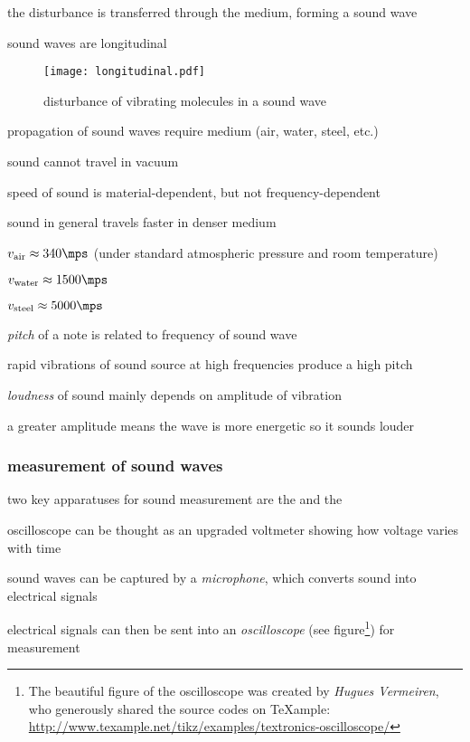 the disturbance is transferred through the medium, forming a sound wave

\cmt sound waves are longitudinal
	
\begin{figure}[htp]
\centering
	\texttt{[image: longitudinal.pdf]}
	\caption*{disturbance of vibrating molecules in a sound wave}
\end{figure}

\cmt propagation of sound waves require medium (air, water, steel, etc.)
	
sound cannot travel in vacuum
	
\cmt speed of sound is material-dependent, but not frequency-dependent
	
	sound in general travels faster in denser medium
	
	\titem $v_\text{air} \approx 340 \mps$ (under standard atmospheric pressure and room temperature)
	
	\titem $v_\text{water} \approx 1500 \mps$
	
	\titem $v_\text{steel} \approx 5000 \mps$
	
\cmt \emph{pitch} of a note is related to frequency of sound wave

rapid vibrations of sound source at high frequencies produce a high pitch

\cmt \emph{loudness} of sound mainly depends on amplitude of vibration

a greater amplitude means the wave is more energetic so it sounds louder
	

\subsubsection*{measurement of sound waves}

two key apparatuses for sound measurement are the  and the 

oscilloscope can be thought as an upgraded voltmeter showing how voltage varies with time

sound waves can be captured by a \emph{microphone}, which converts sound into electrical signals

electrical signals can then be sent into an \emph{oscilloscope} (see figure\footnote{The beautiful figure of the oscilloscope was created by \emph{Hugues Vermeiren}, who generously shared the source codes on TeXample: \url{http://www.texample.net/tikz/examples/textronics-oscilloscope/}}) for measurement

